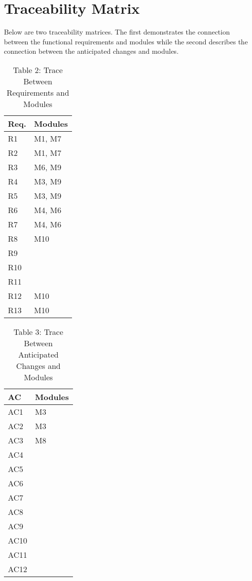 \documentclass{article}
\begin{document}
\section*{Traceability Matrix}

Below are two traceability matrices. The first demonstrates the connection between the functional requirements and modules while the second describes the connection between the anticipated changes and modules.

\begin{table}[]
	\centering
	\begin{tabular}{p{} p{}}
		\toprule
		\textbf{Req.} & \textbf{Modules}\\
		\midrule
		R1 & M1, M7\\
		R2 & M1, M7\\
		R3 & M6, M9\\
		R4 & M3, M9\\
		R5 & M3, M9\\
		R6 & M4, M6\\
		R7 & M4, M6\\
		R8 & M10\\
		R9 & \\ %
		R10 & \\ %
		R11 & \\ %
		R12 & M10\\
		R13 & M10\\
		\bottomrule
	\end{tabular}
	\caption{Table 2: Trace Between Requirements and Modules}
	
\end{table}

\begin{table}[]
	\centering
	\begin{tabular}{p{} p{}}
		\toprule
		\textbf{AC} & \textbf{Modules}\\
		\midrule
		AC1 & M3\\ %
		AC2 & M3\\
		AC3 & M8\\
		AC4 & \\
		AC5 & \\
		AC6 & \\
		AC7 & \\
		AC8 & \\
		AC9 & \\
		AC10 & \\
		AC11 & \\
		AC12 & \\
		
		\bottomrule
	\end{tabular}
	\caption{Table 3: Trace Between Anticipated Changes and Modules}
	
\end{table}
\end{document}
